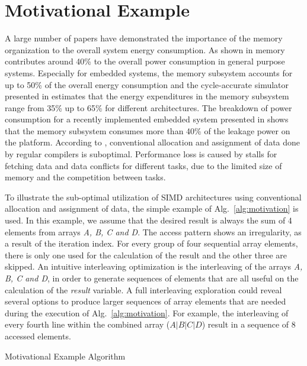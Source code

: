 \documentclass[prodmode,acmtodaes]{acmsmall}
\begin{document}
\section{Motivational Example}
\label{sec:motivational}

A large number of papers have demonstrated the importance of the memory organization to the overall system energy consumption. 
As shown in \cite{Gonzalez1996} memory contributes around 40\% to the overall power consumption in general purpose systems. 
Especially for embedded systems, the memory subsystem accounts for up to 50\% of the overall energy consumption \cite{Che09} and the cycle-accurate simulator presented in \cite{Ben99} estimates that the energy expenditures in the memory subsystem range from 35\% up to 65\% for different architectures. 
The breakdown of power consumption for a recently implemented embedded system presented in \cite{Hul11} shows that the memory subsystem consumes more than 40\% of the leakage power on the platform. 
According to \cite{tcm}, conventional allocation and assignment of data done by regular compilers is suboptimal. 
Performance loss is caused by stalls for fetching data and data conflicts for different tasks, due to the limited size of memory and the competition between tasks. 

To illustrate the sub-optimal utilization of SIMD architectures using conventional allocation and assignment of data, the simple example of Alg.~\ref{alg:motivation} is used.
In this example, we assume that the desired result is always the sum of 4 elements from arrays \textit{A, B, C and D}. 
The access pattern shows an irregularity, as a result of the iteration index.
For every group of four sequential array elements, there is only one used for the calculation of the result and the other three are skipped.
An intuitive interleaving optimization is the interleaving of the arrays \textit{A, B, C and D}, in order to generate sequences of elements that are all useful on the calculation of the \textit{result} variable. 
A full interleaving exploration could reveal several options to produce larger sequences of array elements that are needed during the execution of Alg.~\ref{alg:motivation}.
For example, the interleaving of every fourth line within the combined array ($A\vert B\vert C\vert D$) result in a sequence of 8 accessed elements.

\begin{algorithm}[t]
\SetAlgoNoLine
{}
\caption{Motivational Example Algorithm}
\label{alg:motivation}
\end{algorithm}
\end{document}
